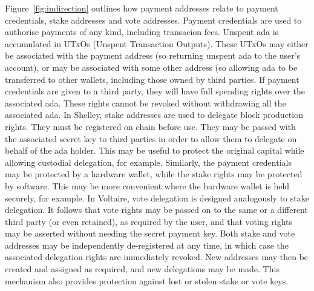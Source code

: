 Figure~\ref{fig:indirection} outlines how payment addresses relate to payment credentials, stake addresses  and vote addresses.  Payment credentials are used to
authorise payments of any kind, including transacion fees.  Unspent ada is accumulated in UTxOs (Unspent Transaction Outputs).  These UTxOs may either be associated
with the payment address (so returning unspent ada to the user's account), or may be associated with some other address (so allowing ada to be transferred to other wallets,
including those owned by third parties.  If payment credentials are given to a third party, they will have full spending rights over the associated ada.  These rights cannot be
revoked without withdrawing all the associated ada. 
In Shelley, stake addresses are used to delegate block production rights.  They must be registered on chain before use.  They may be passed with the associated secret key to third parties
in order to allow them to delegate on behalf of the ada holder.  This may be useful to protect the original capital while allowing custodial delegation, for example.  Similarly,
the payment credentials may be protected by a hardware wallet, while the stake rights may be protected by software.  This may be more convenient where the hardware wallet is
held securely, for example.
In Voltaire, vote delegation is designed analogously to stake delegation.  It follows that vote rights may be passed on to the same or a different third party (or even retained), as required by the user,
and that voting rights may be asserted without needing the secret payment key.  Both stake and vote addresses may be independently de-registered at any time, in which case the associated delegation rights are immediately
revoked.  New addresses may then be created and assigned as required, and new delegations may be made.  This mechanism also provides protection against lost or stolen stake or vote keys.

